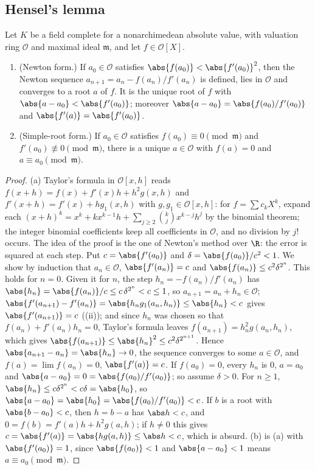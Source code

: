 \subsection{Hensel's lemma}

\begin{theorem}\label{thm:local:hensel}
Let $K$ be a field complete for a nonarchimedean absolute value, with valuation ring $\mathcal O$ and maximal ideal $\mathfrak m$, and let
$f\in\mathcal O[X]$.
\begin{enumerate}[label=(\alph*)]
\item (Newton form.) If $a_0\in\mathcal O$ satisfies $\abs{f(a_0)}<\abs{f'(a_0)}^2$, then the Newton sequence $a_{n+1}=a_n-f(a_n)/f'(a_n)$ is
defined, lies in $\mathcal O$ and converges to a root $a$ of $f$. It is the unique root of $f$ with $\abs{a-a_0}<\abs{f'(a_0)}$; moreover
$\abs{a-a_0}=\abs{f(a_0)/f'(a_0)}$ and $\abs{f'(a)}=\abs{f'(a_0)}$.
\item (Simple-root form.) If $a_0\in\mathcal O$ satisfies $f(a_0)\equiv0\pmod{\mathfrak m}$ and $f'(a_0)\not\equiv0\pmod{\mathfrak m}$, there is a
unique $a\in\mathcal O$ with $f(a)=0$ and $a\equiv a_0\pmod{\mathfrak m}$.
\end{enumerate}
\end{theorem}

\begin{proof}
(a) Taylor's formula in $\mathcal O[x,h]$ reads $f(x+h)=f(x)+f'(x)h+h^2g(x,h)$ and $f'(x+h)=f'(x)+hg_1(x,h)$ with $g,g_1\in\mathcal O[x,h]$: for
$f=\sum c_kX^k$, expand each $(x+h)^k=x^k+kx^{k-1}h+\sum_{j\ge2}\binom kjx^{k-j}h^j$ by the binomial theorem; the integer binomial coefficients keep all
coefficients in $\mathcal O$, and no division by $j!$ occurs. The idea of the proof is the one of Newton's method over $\R$: the error is
squared at each step. Put
$c=\abs{f'(a_0)}$ and $\delta=\abs{f(a_0)}/c^2<1$. We show by induction that $a_n\in\mathcal O$, $\abs{f'(a_n)}=c$ and $\abs{f(a_n)}\le c^2\delta^{2^n}$. This
holds for $n=0$. Given it for $n$, the step $h_n=-f(a_n)/f'(a_n)$ has $\abs{h_n}=\abs{f(a_n)}/c\le c\,\delta^{2^n}<c\le1$, so $a_{n+1}=a_n+h_n\in\mathcal O$;
$\abs{f'(a_{n+1})-f'(a_n)}=\abs{h_ng_1(a_n,h_n)}\le\abs{h_n}<c$ gives $\abs{f'(a_{n+1})}=c$ ((ii)); and since $h_n$ was chosen
so that $f(a_n)+f'(a_n)h_n=0$, Taylor's formula leaves $f(a_{n+1})=h_n^2g(a_n,h_n)$, which gives
$\abs{f(a_{n+1})}\le\abs{h_n}^2\le c^2\delta^{2^{n+1}}$. Hence $\abs{a_{n+1}-a_n}=\abs{h_n}\to0$, the sequence converges to some $a\in\mathcal O$, and
$f(a)=\lim f(a_n)=0$, $\abs{f'(a)}=c$. If $f(a_0)=0$, every $h_n$ is $0$, $a=a_0$ and $\abs{a-a_0}=0=\abs{f(a_0)/f'(a_0)}$; so assume $\delta>0$. For $n\ge1$, $\abs{h_n}\le c\delta^{2^n}<c\delta=\abs{h_0}$, so $\abs{a-a_0}=\abs{h_0}=\abs{f(a_0)/f'(a_0)}<c$. If $b$ is a
root with $\abs{b-a_0}<c$, then $h=b-a$ has $\abs h<c$, and $0=f(b)=f'(a)h+h^2g(a,h)$; if $h\ne0$ this gives $c=\abs{f'(a)}=\abs{hg(a,h)}\le\abs h<c$,
which is absurd. (b) is (a) with $\abs{f'(a_0)}=1$, since $\abs{f(a_0)}<1$ and $\abs{a-a_0}<1$ means $a\equiv a_0\pmod{\mathfrak m}$.
\end{proof}

